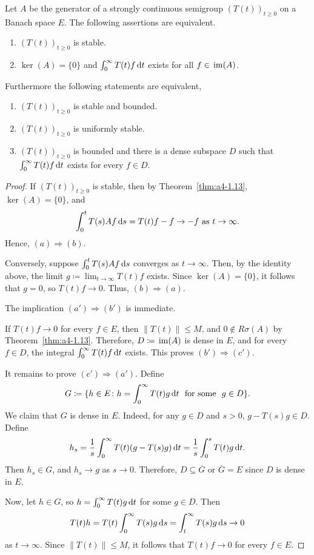 \begin{theorem}\label{thm:a4-1.16}
Let $A$ be the generator of a strongly continuous semigroup $(T(t))_{t \geq 0}$ on a Banach space $E$. 
The following assertions are equivalent.
\begin{enumerate}[\upshape (a)]
\item 
$(T(t))_{t \geq 0}$ is stable.

\item 
$\ker(A) = \{0\}$ and $\int_{0}^{\infty} T(t)f  \mathop{}\!\mathrm{d}{t}$ exists for all $f \in \mathop{}\mathrm{im}(A)$.

\end{enumerate}
Furthermore the following statements are equivalent,
\begin{enumerate}[(a')]
\item $(T(t))_{t \geq 0}$ is stable and bounded.
\item $(T(t))_{t \geq 0}$ is uniformly stable.
\item $(T(t))_{t \geq 0}$ is bounded and there is a dense subspace $D$ such that $\int_{0}^{\infty} T(t)f  \mathop{}\!\mathrm{d}{t}$ exists for every $f \in D$.
\end{enumerate}
\end{theorem}
\begin{proof}
If\/ $(T(t))_{t \geq 0}$ is stable, then by Theorem~\ref{thm:a4-1.13}, $\ker(A) = \{0\}$, and
\[{
\int_{0}^{t} T(s)Af  \mathop{}\!\mathrm{d}{s} = T(t)f - f \to -f \ \text{as} \ t \to \infty .
}\]
Hence, $(a) \Rightarrow (b)$.

Conversely, suppose $\int_{0}^{t} T(s)Af  \mathop{}\!\mathrm{d}{s}$ converges as $t \to \infty$. Then, by
the identity above, the limit $g \coloneq \lim_{t \to \infty} T(t)f$ exists. 
Since $\ker(A) = \{0\}$, it follows that $g = 0$, so $T(t)f \to 0$. 
Thus, $(b) \Rightarrow (a)$.

The implication $(a') \Rightarrow (b')$ is immediate. 

If\/ $T(t)f \to 0$ for every $f \in E$, then $\|T(t)\| \leq M$, and $0 \not\in R\sigma(A)$ by Theorem~\ref{thm:a4-1.13}. 
Therefore,
$D \coloneq \mathop{}\mathrm{im}(A)$ is dense in $E$, and for every $f \in D$, the integral $\int_{0}^{\infty} T(t)f  \mathop{}\!\mathrm{d}{t}$ exists. 
This proves $(b') \Rightarrow (c')$. 

It remains to prove $(c') \Rightarrow (a')$.
Define 
\[
G \coloneq \{h \in E \colon h = \int_{0}^{\infty} T(t)g  \mathop{}\!\mathrm{d}{t} \ \text{ for some } \ g \in D\}.
\] 
We claim that $G$ is dense in $E$. 
Indeed, for any $g\in D$ and $s>0$,  $g - T(s)g \in D$.
Define 
%
\[
	h_{s} = \frac{1}{s} \int_{0}^{\infty} T(t)(g - T(s)g)  \mathop{}\!\mathrm{d}{t} = \frac{1}{s} \int_{0}^{s} T(t)g  \mathop{}\!\mathrm{d}{t} .
\]
%
Then $h_{s} \in G$, and $h_{s} \to g$ as $s \to 0$. 
Therefore, $D \subseteq \overline{G}$ or $\overline{G} = E$ since $D$ is dense in $E$. 

Now, let $h \in G$, so $h=\int_0^\infty T(t)g\mathop{}\!\mathrm{d}{t}$ for some $g\in D$.
Then %
\[
	T(t)h = T(t) \int_{0}^{\infty} T(s)g  \mathop{}\!\mathrm{d}{s} = \int_{t}^{\infty} T(s)g  \mathop{}\!\mathrm{d}{s} \to 0 
\]
%
as $t \to \infty$.
Since $\|T(t)\| \leq M$, it follows that   $T(t)f \to 0$ for every $f \in E$.
\end{proof}
